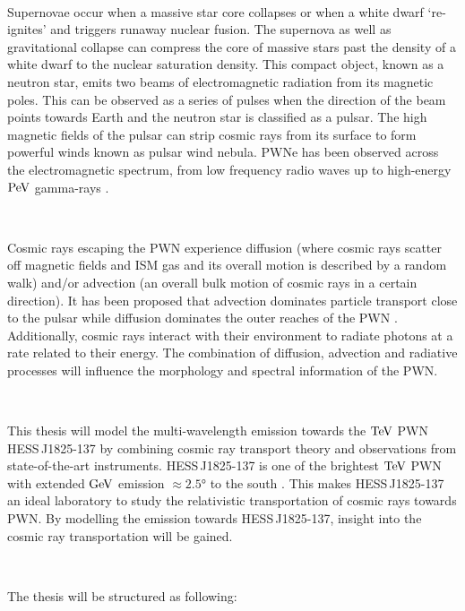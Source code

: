 \par~\par 
Supernovae occur when a massive star core collapses or when a white dwarf `re-ignites' and triggers runaway nuclear fusion. The supernova as well as gravitational collapse can compress the core of massive stars past the density of a white dwarf to the nuclear saturation density. This compact object, known as a neutron star, emits two beams of electromagnetic radiation from its magnetic poles. This can be observed as a series of pulses when the direction of the beam points towards Earth and the neutron star is classified as a pulsar. The high magnetic fields of the pulsar can strip cosmic rays from its surface to form powerful winds known as pulsar wind nebula. PWNe has been observed across the electromagnetic spectrum, from low frequency radio waves \citep{1968Natur.217..709H} up to high-energy $\PeV$ gamma-rays \citep{doi:10.1126/science.abg5137}.
\par~\par
Cosmic rays escaping the PWN experience diffusion (where cosmic rays scatter off magnetic fields and ISM gas and its overall motion is described by a random walk) and/or advection (an overall bulk motion of cosmic rays in a certain direction). It has been proposed that advection dominates particle transport close to the pulsar while diffusion dominates the outer reaches of the PWN \citep{2020A&A...636A.113G, 2021PhRvD.104l3017R}. Additionally, cosmic rays interact with their environment to radiate photons at a rate related to their energy. The combination of diffusion, advection and radiative processes will influence the morphology and spectral information of the PWN.
\par~\par 
This thesis will model the multi-wavelength emission towards the $\TeV$ PWN \mbox{HESS\,J1825-137} by combining cosmic ray transport theory and observations from state-of-the-art instruments. \mbox{HESS\,J1825-137} is one of the brightest $\TeV$ PWN with extended $\si{\giga\electronvolt}$ emission $\approx \ang{2.5}$ to the south \citep{2019MNRAS.485.1001A}. This makes \mbox{HESS\,J1825-137} an ideal laboratory to study the relativistic transportation of cosmic rays towards PWN. By modelling the emission towards \mbox{HESS\,J1825-137}, insight into the cosmic ray transportation will be gained.
\par~\par
The thesis will be structured as following:
